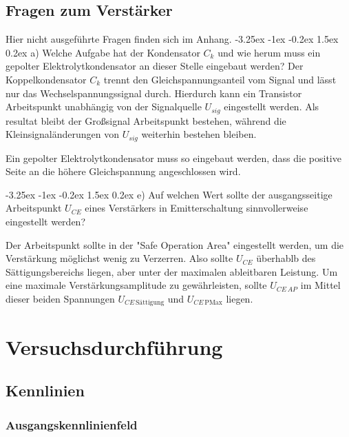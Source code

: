 \documentclass[
	a4paper, %
	12pt, %
]{CSUniSchoolLabReport}
\makeatletter
\renewcommand\paragraph{\@startsection{paragraph}{4}{\z@}%
  {-3.25ex \@plus -1ex \@minus -0.2ex}%
  {1.5ex \@plus 0.2ex}%
  {\normalfont\normalsize\bfseries}}
\makeatother
\begin{document}
\subsection{Fragen zum Verstärker}
Hier nicht ausgeführte Fragen finden sich im Anhang.
\paragraph{a) Welche Aufgabe hat der Kondensator $C_k$ und wie herum muss ein gepolter Elektrolytkondensator an dieser Stelle eingebaut werden?}
Der Koppelkondensator $C_k$ trennt den Gleichspannungsanteil vom Signal und lässt nur das Wechselspannungssignal durch.
Hierdurch kann ein Transistor Arbeitspunkt unabhängig von der Signalquelle $U_{sig}$ eingestellt werden. Als resultat bleibt der Großsignal Arbeitspunkt bestehen, während die Kleinsignaländerungen von $U_{sig}$ weiterhin bestehen bleiben. 



Ein gepolter Elektrolytkondensator muss so eingebaut werden, dass die positive Seite an die höhere Gleichspannung angeschlossen wird.


\paragraph{e) Auf welchen Wert sollte der ausgangsseitige Arbeitspunkt $U_{CE}$ eines Verstärkers in Emitterschaltung sinnvollerweise eingestellt werden? }

Der Arbeitspunkt sollte in der "Safe Operation Area" eingestellt werden, um die Verstärkung möglichst wenig zu Verzerren. Also sollte $U_{CE}$ überhablb des Sättigungsbereichs liegen, aber unter der maximalen ableitbaren Leistung. 
Um eine maximale Verstärkungsamplitude zu gewährleisten, sollte $U_{CE\,AP}$ im Mittel dieser beiden Spannungen $U_{CE\,\text{Sättigung}}$ und $U_{CE\,\text{PMax}}$ liegen.




\section{Versuchsdurchführung}
\subsection{Kennlinien }
\subsubsection{Ausgangskennlinienfeld}
\end{document}

